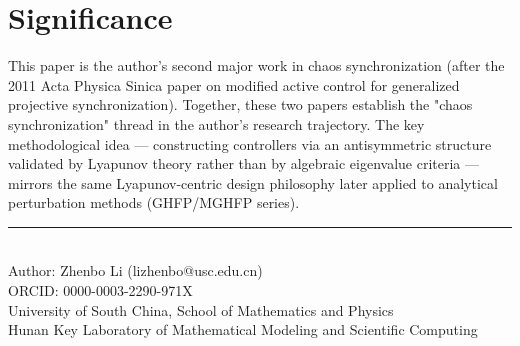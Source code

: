 \documentclass[11pt,a4paper]{article}
\begin{document}
\section{Significance}

This paper is the author's second major work in chaos synchronization (after the 2011 Acta Physica Sinica paper on modified active control for generalized projective synchronization). Together, these two papers establish the "chaos synchronization" thread in the author's research trajectory. The key methodological idea --- constructing controllers via an antisymmetric structure validated by Lyapunov theory rather than by algebraic eigenvalue criteria --- mirrors the same Lyapunov-centric design philosophy later applied to analytical perturbation methods (GHFP/MGHFP series).

\vfill
\begin{center}
\small\rule{0.5\textwidth}{0.3pt}\\[4pt]
\small\color{primary} Author: Zhenbo Li (lizhenbo@usc.edu.cn)\\
\small ORCID: 0000-0003-2290-971X\\
\small University of South China, School of Mathematics and Physics\\
\small Hunan Key Laboratory of Mathematical Modeling and Scientific Computing
\end{center}
\end{document}
